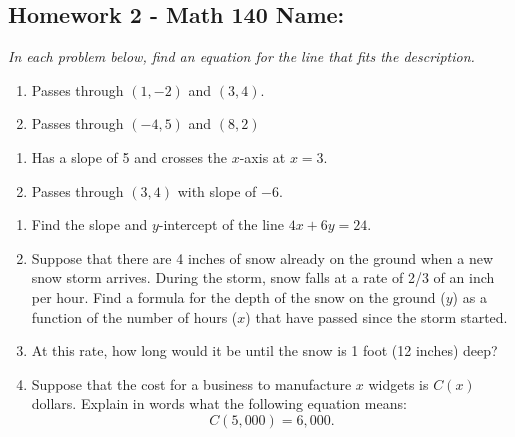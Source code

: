 \documentclass[10pt]{article}
\begin{document}
\pagestyle{empty}
\subsection*{Homework 2 - Math 140 \hfill Name: \underline{\hspace*{2in}}}


\noindent 
\textit{In each problem below, find an equation for the line that fits the description.}
\begin{multicols}{2}
\begin{enumerate}
\setcounter{enumi}{\theenumCount}
\item Passes through $(1,-2)$ and $(3,4)$.
\item Passes through $(-4,5)$ and $(8,2)$ 
\setcounter{enumCount}{\theenumi}
\end{enumerate}
\end{multicols}
\vfill




\begin{multicols}{2}
\begin{enumerate}
\setcounter{enumi}{\theenumCount}
\item Has a slope of 5 and crosses the $x$-axis at $x=3$.
\item Passes through $(3,4)$ with slope of $-6$.
\setcounter{enumCount}{\theenumi}
\end{enumerate}
\end{multicols}
\vfill


\begin{enumerate}
\setcounter{enumi}{\theenumCount}
\item Find the slope and $y$-intercept of the line $4x + 6y = 24$.
\vfill


\item Suppose that there are 4 inches of snow already on the ground when a new snow storm arrives.  During the storm, snow falls at a rate of 2/3 of an inch per hour.  Find a formula for the depth of the snow on the ground ($y$) as a function of the number of hours ($x$) that have passed since the storm started. 
\vfill

\item At this rate, how long would it be until the snow is 1 foot (12 inches) deep?  
\vfill


\newpage

\item  Suppose that the cost for a business to manufacture $x$ widgets is $C(x)$ dollars.  Explain in words what the following equation means:
$$C(5{,}000) = 6{,}000.$$
\vfill
\setcounter{enumCount}{\theenumi}
\end{enumerate}
\end{document}
